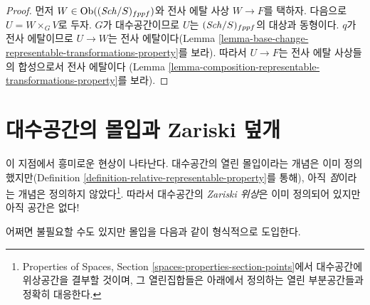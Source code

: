 \begin{proof}
먼저 $W \in \mathop{\mathrm{Ob}}\nolimits((\mathit{Sch}/S)_{fppf})$와 전사 에탈 사상
$W \to F$를 택하자. 다음으로 $U = W \times_G V$로 두자.
$G$가 대수공간이므로 $U$는 $(\mathit{Sch}/S)_{fppf}$의 대상과 동형이다.
$q$가 전사 에탈이므로 $U \to W$는 전사 에탈이다(Lemma
\ref{lemma-base-change-representable-transformations-property}를 보라).
따라서 $U \to F$는 전사 에탈 사상들의 합성으로서 전사 에탈이다
(Lemma \ref{lemma-composition-representable-transformations-property}를
보라).
\end{proof}



























\section{대수공간의 몰입과 Zariski 덮개}
\label{section-Zariski}

\noindent
이 지점에서 흥미로운 현상이 나타난다. 대수공간의 열린 몰입이라는 개념은
이미 정의했지만(Definition \ref{definition-relative-representable-property}를
통해), 아직 {\it 점}이라는 개념은 정의하지 않았다\footnote{Properties of
Spaces, Section \ref{spaces-properties-section-points}에서 대수공간에
위상공간을 결부할 것이며, 그 열린집합들은 아래에서 정의하는 열린
부분공간들과 정확히 대응한다.}. 따라서 대수공간의 {\it Zariski 위상}은
이미 정의되어 있지만 아직 공간은 없다!

\medskip\noindent
어쩌면 불필요할 수도 있지만 몰입을 다음과 같이 형식적으로 도입한다.

